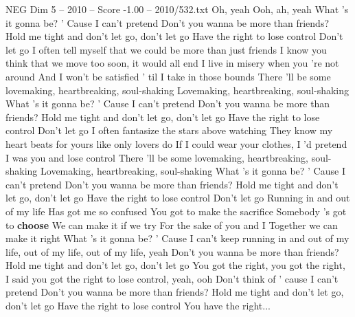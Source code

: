 \begin{textsample}{NEG Dim 5 – 2010 – Score -1.00 – 2010/532.txt}  \label{ex:f5_neg_015}
Oh, yeah Ooh, ah, yeah What 's it gonna be? ' Cause I can't pretend Don't you wanna be more than friends?
Hold me tight and don't let go, don't let go Have the right to lose control Don't let go I often tell myself that we could be more than just friends I know you think that we move too soon, it would all end I live in misery when you 're not around And I won't be satisfied ' til I take in those bounds There 'll be some lovemaking, heartbreaking, soul-shaking Lovemaking, heartbreaking, soul-shaking What 's it gonna be? ' Cause I can't pretend Don't you wanna be more than friends?
Hold me tight and don't let go, don't let go Have the right to lose control Don't let go I often fantasize the stars above watching They know my heart beats for yours like only lovers do If I could wear your clothes, I 'd pretend I was you and lose control There 'll be some lovemaking, heartbreaking, soul-shaking Lovemaking, heartbreaking, soul-shaking What 's it gonna be? ' Cause I can't pretend Don't you wanna be more than friends?
Hold me tight and don't let go, don't let go Have the right to lose control Don't let go Running in and out of my life Has got me so confused You got to make the sacrifice Somebody 's got to \textbf{choose} We can make it if we try For the sake of you and I Together we can make it right What 's it gonna be? ' Cause I can't keep running in and out of my life, out of my life, out of my life, yeah Don't you wanna be more than friends?
Hold me tight and don't let go, don't let go You got the right, you got the right, I said you got the right to lose control, yeah, ooh Don't think of ' cause I can't pretend Don't you wanna be more than friends?
Hold me tight and don't let go, don't let go Have the right to lose control You have the right...

\end{textsample}
